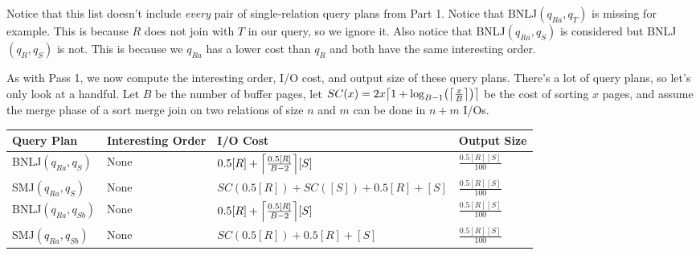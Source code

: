 \documentclass{article}
\begin{document}
\begin{center}





\end{center}

Notice that this list doesn't include \emph{every} pair of single-relation
query plans from Part 1. Notice that BNLJ$(q_{Ra}, q_T)$ is missing for
example. This is because $R$ does not join with $T$ in our query, so we ignore
it. Also notice that BNLJ$(q_{Ra}, q_S)$ is considered but BNLJ$(q_R, q_S)$ is
not. This is because we $q_{Ra}$ has a lower cost than $q_{R}$ and both have
the same interesting order.

As with Pass 1, we now compute the interesting order, I/O cost, and output size
of these query plans. There's a lot of query plans, so let's only look at a
handful. Let $B$ be the number of buffer pages, let $SC(x) = \sortcost{x}$ be
the cost of sorting $x$ pages, and assume the merge phase of a sort merge join
on two relations of size $n$ and $m$ can be done in $n + m$ I/Os.

\begin{center}
  \renewcommand{\arraystretch}{2}
  \begin{tabular}{|l|l|l|l|}
    \hline
    Query Plan             & Interesting Order & I/O Cost                              & Output Size \\\hline\hline
    BNLJ$(q_{Ra}, q_{S})$  & None              & $\bnlj{0.5[R]}{[S]}$                  & $\frac{0.5[R][S]}{100}$ \\\hline
    SMJ$(q_{Ra}, q_{S})$   & None              & $SC(0.5[R]) + SC([S]) + 0.5[R] + [S]$ & $\frac{0.5[R][S]}{100}$ \\\hline
    BNLJ$(q_{Ra}, q_{Sb})$ & None              & $\bnlj{0.5[R]}{[S]}$                  & $\frac{0.5[R][S]}{100}$ \\\hline
    SMJ$(q_{Ra}, q_{Sb})$  & None              & $SC(0.5[R]) + 0.5[R] + [S]$           & $\frac{0.5[R][S]}{100}$ \\\hline
  \end{tabular}
\end{center}
\end{document}

